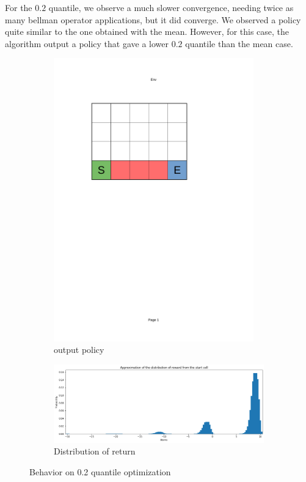 For the $0.2$ quantile, we observe a much slower convergence, needing twice as many bellman operator applications, but it did converge. We observed a policy quite similar to the one obtained with the mean. However, for this case, the algorithm output a policy that gave a lower $0.2$ quantile than the mean case.

\begin{figure}[!ht]
    \centering
    \begin{subfigure}{0.25\textwidth} 
        \centering
            \includegraphics[page=6, trim = 40mm 160mm 70mm 45mm, clip, width=0.95\textwidth]{figures/personal_work/policies.pdf}
        \caption{output policy}
    \end{subfigure}
    \hfill
    \begin{subfigure}{0.70\textwidth}
        \centering
            \includegraphics[width=\textwidth]{figures/personal_work/distrib_q20.png}
        \caption{Distribution of return}
    \end{subfigure}
        \caption{Behavior on 0.2 quantile optimization}
\end{figure}

